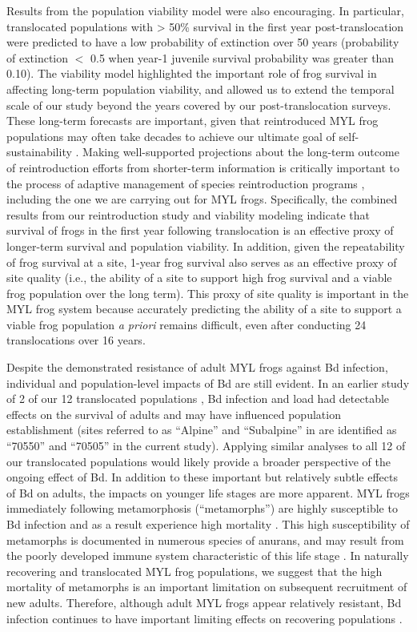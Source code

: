 \documentclass[
  letterpaper,
  DIV=11,
  numbers=noendperiod]{scrartcl}
\begin{document}
Results from the population viability model were also encouraging. In
particular, translocated populations with \textgreater{} 50\% survival
in the first year post-translocation were predicted to have a low
probability of extinction over 50 years (probability of extinction \(<\)
0.5 when year-1 juvenile survival probability was greater than 0.10).
The viability model highlighted the important role of frog survival in
affecting long-term population viability, and allowed us to extend the
temporal scale of our study beyond the years covered by our
post-translocation surveys. These long-term forecasts are important,
given that reintroduced MYL frog populations may often take decades to
achieve our ultimate goal of self-sustainability \citep{joseph2018}.
Making well-supported projections about the long-term outcome of
reintroduction efforts from shorter-term information is critically
important to the process of adaptive management of species
reintroduction programs \citep{seddon2007}, including the one we are
carrying out for MYL frogs. Specifically, the combined results from our
reintroduction study and viability modeling indicate that survival of
frogs in the first year following translocation is an effective proxy of
longer-term survival and population viability. In addition, given the
repeatability of frog survival at a site, 1-year frog survival also
serves as an effective proxy of site quality (i.e., the ability of a
site to support high frog survival and a viable frog population over the
long term). This proxy of site quality is important in the MYL frog
system because accurately predicting the ability of a site to support a
viable frog population \emph{a priori} remains difficult, even after
conducting 24 translocations over 16 years.

Despite the demonstrated resistance of adult MYL frogs against Bd
infection, individual and population-level impacts of Bd are still
evident. In an earlier study of 2 of our 12 translocated populations
\citep{joseph2018}, Bd infection and load had detectable effects on the
survival of adults and may have influenced population establishment
(sites referred to as ``Alpine'' and ``Subalpine'' in \citet{joseph2018}
are identified as ``70550'' and ``70505'' in the current study).
Applying similar analyses to all 12 of our translocated populations
would likely provide a broader perspective of the ongoing effect of Bd.
In addition to these important but relatively subtle effects of Bd on
adults, the impacts on younger life stages are more apparent. MYL frogs
immediately following metamorphosis (``metamorphs'') are highly
susceptible to Bd infection \citep{ellison2019} and as a result
experience high mortality \citep{rachowicz2006}. This high
susceptibility of metamorphs is documented in numerous species of
anurans, and may result from the poorly developed immune system
characteristic of this life stage \citep{humphries2022}. In naturally
recovering and translocated MYL frog populations, we suggest that the
high mortality of metamorphs is an important limitation on subsequent
recruitment of new adults. Therefore, although adult MYL frogs appear
relatively resistant, Bd infection continues to have important limiting
effects on recovering populations \citep[see also][]{hollanders2022}.
\end{document}
